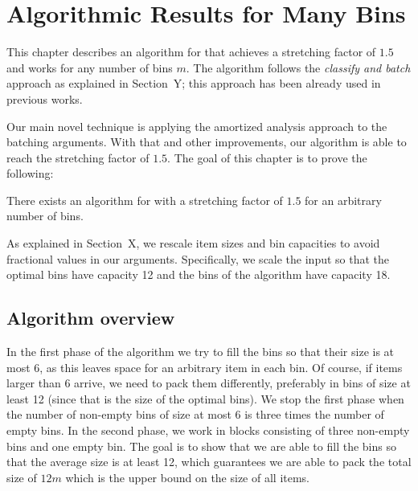 \chapter{Algorithmic Results for Many Bins}\label{chap:manybins}


This chapter describes an algorithm for \binstretch that achieves a
stretching factor of $1.5$ and works for any number of bins $m$. The
algorithm follows the \emph{classify and batch} approach as explained
in Section~Y; this approach has been already used in previous works.

Our main novel technique is applying the amortized analysis approach
to the batching arguments. With that and other improvements, our
algorithm is able to reach the stretching factor of $1.5$. The
goal of this chapter is to prove the following:

\begin{thm}\label{thm:onepointfive}
There exists an algorithm for \binstretch with a stretching factor of
$1.5$ for an arbitrary number of bins.
\end{thm}

As explained in Section~X, we rescale item sizes and bin capacities to
avoid fractional values in our arguments. Specifically, we scale the
input so that the optimal bins have capacity 12 and the bins of the
algorithm have capacity 18.


\section{Algorithm overview}\label{chap:2:overview}

In the first phase of the algorithm we try to fill the bins so that
their size is at most 6, as this leaves space for an arbitrary item in
each bin. Of course, if items larger than 6 arrive, we need to pack
them differently, preferably in bins of size at least 12 (since that
is the size of the optimal bins). We stop the first phase when the
number of non-empty bins of size at most 6 is three times the number
of empty bins. In the second phase, we work in blocks consisting of
three non-empty bins and one empty bin. The goal is to show that we
are able to fill the bins so that the average size is at least 12,
which guarantees we are able to pack the total size of $12m$ which is
the upper bound on the size of all items.


